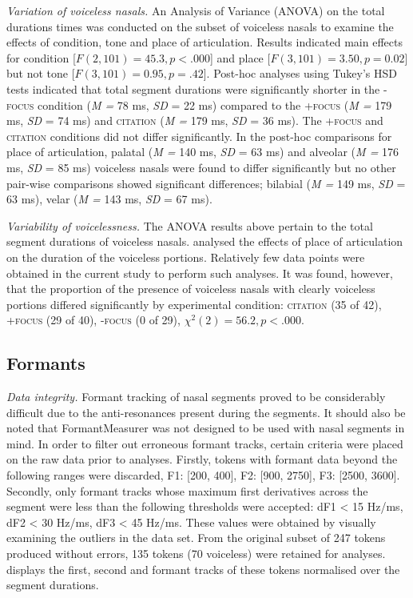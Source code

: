 \documentclass[12pt]{article}
\newcommand{\condc}{\textsc{citation }}
\newcommand{\condf}{\textsc{+focus }}
\newcommand{\condu}{\textsc{-focus }}
\begin{document}
\newpage

\emph{Variation of voiceless nasals.} An Analysis of Variance (ANOVA) on the total durations times was conducted on the subset of voiceless nasals to examine the effects of condition, tone and place of articulation. Results indicated main effects for condition [$F(2, 101) = 45.3, p < .000$] and place [$F(3, 101) = 3.50, p = 0.02$] but not tone [$F(3, 101) = 0.95, p = .42$]. Post-hoc analyses using Tukey's HSD tests indicated that total segment durations were significantly shorter in the \condu condition (\emph{M =} 78 ms, \emph{SD} = 22 ms) compared to the \condf (\emph{M =} 179 ms, \emph{SD} = 74 ms) and \condc (\emph{M =} 179 ms, \emph{SD} = 36 ms). The \condf and \condc conditions did not differ significantly. In the post-hoc comparisons for place of articulation, palatal (\emph{M =} 140 ms, \emph{SD} = 63 ms) and alveolar (\emph{M =} 176 ms, \emph{SD} = 85 ms) voiceless nasals were found to differ significantly but no other pair-wise comparisons showed significant differences; bilabial (\emph{M =} 149 ms, \emph{SD} = 63 ms), velar (\emph{M =} 143 ms, \emph{SD} = 67 ms).

\emph{Variability of voicelessness.} The ANOVA results above pertain to the total segment durations of voiceless nasals. \citet{dantsuji1984study} analysed the effects of place of articulation on the duration of the voiceless portions. Relatively few data points were obtained in the current study to perform such analyses. It was found, however, that the proportion of the presence of voiceless nasals with clearly voiceless portions differed significantly by experimental condition: \condc (35 of 42), \condf (29 of 40), \condu(0 of 29), $\chi^2(2) = 56.2, p < .000$.

\subsection{Formants}

\emph{Data integrity.} Formant tracking of nasal segments proved to be considerably difficult due to the anti-resonances present during the segments. It should also be noted that FormantMeasurer \citep{morisson2011formant} was not designed to be used with nasal segments in mind. In order to filter out erroneous formant tracks, certain criteria were placed on the raw data prior to analyses. Firstly, tokens with formant data beyond the following ranges were discarded, F1: [200, 400], F2: [900, 2750], F3: [2500, 3600]. Secondly, only formant tracks whose maximum first derivatives across the segment were less than the following thresholds were accepted: dF1 < 15 Hz/ms, dF2 < 30 Hz/ms, dF3 < 45 Hz/ms. These values were obtained by visually examining the outliers in the data set. From the original subset of 247 tokens produced without errors, 135 tokens (70 voiceless) were retained for analyses.  displays the first, second and formant tracks of these tokens normalised over the segment durations.
\end{document}
